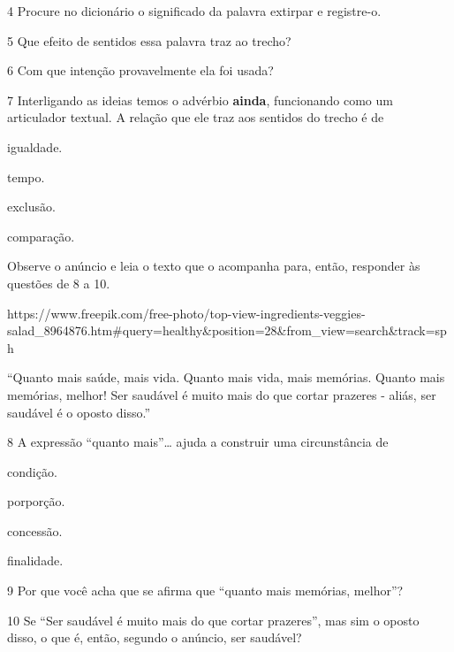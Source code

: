 {\begin{itemize}
\num{4} Procure no dicionário o significado da palavra extirpar e
registre-o.  

\num{5} Que efeito de sentidos essa palavra traz ao trecho? 

\num{6} Com que intenção provavelmente ela foi usada? 

\num{7} Interligando as ideias temos o advérbio \textbf{ainda},
funcionando como um articulador textual. A relação que ele traz aos
sentidos do trecho é de

 igualdade.

 tempo.

 exclusão.

 comparação.

Observe o anúncio e leia o texto que o acompanha para, então, responder
às questões de 8 a 10.

https://www.freepik.com/free-photo/top-view-ingredients-veggies-salad\_8964876.htm\#query=healthy\&position=28\&from\_view=search\&track=sph

``Quanto mais saúde, mais vida. Quanto mais vida, mais memórias. Quanto
mais memórias, melhor! Ser saudável é muito mais do que cortar prazeres
- aliás, ser saudável é o oposto disso.''

\num{8} A expressão ``quanto mais''\ldots{} ajuda a construir uma
circunstância de

 condição.

 porporção.

 concessão.

 finalidade.

\num{9} Por que você acha que se afirma que ``quanto mais memórias,
melhor''? 

\num{10} Se ``Ser saudável é muito mais do que cortar prazeres'', mas
sim o oposto disso, o que é, então, segundo o anúncio, ser saudável?


\end{itemize}}

